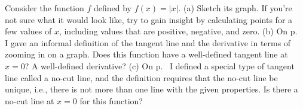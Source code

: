 Consider the function $f$ defined by $f(x)=|x|$.\hwendpart
(a) Sketch its graph. If you're not sure what it would look like, try to gain
insight by calculating points for a few values of $x$, including values that
are positive, negative, and zero.\hwendpart
(b) On p.~\pageref{tangent-line-informal} I gave an informal definition of the
tangent line and the derivative in terms of zooming in on a graph. Does
this function have a well-defined tangent line at $x=0$? A well-defined
derivative?\hwendpart
(c) On p.~\pageref{no-cut} I defined a special type of tangent line called
a no-cut line, and the definition requires that the no-cut line be unique,
i.e., there is not more than one line with the given properties. Is there a no-cut line at $x=0$
for this function?
